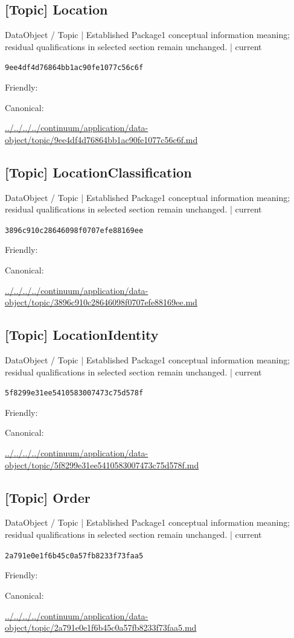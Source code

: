 \documentclass[10pt,a4paper]{article}
\begin{document}
\subsection*{[Topic] Location}
{\small DataObject / Topic | Established Package1 conceptual information meaning; residual qualifications in selected section remain unchanged. | current}\par
\texttt{9ee4df4d76864bb1ac90fe1077c56c6f}\par
Friendly: \par
Canonical: \par
{\footnotesize\url{../../../../continuum/application/data-object/topic/9ee4df4d76864bb1ac90fe1077c56c6f.md}}\par
\subsection*{[Topic] LocationClassification}
{\small DataObject / Topic | Established Package1 conceptual information meaning; residual qualifications in selected section remain unchanged. | current}\par
\texttt{3896c910c28646098f0707efe88169ee}\par
Friendly: \par
Canonical: \par
{\footnotesize\url{../../../../continuum/application/data-object/topic/3896c910c28646098f0707efe88169ee.md}}\par
\subsection*{[Topic] LocationIdentity}
{\small DataObject / Topic | Established Package1 conceptual information meaning; residual qualifications in selected section remain unchanged. | current}\par
\texttt{5f8299e31ee5410583007473c75d578f}\par
Friendly: \par
Canonical: \par
{\footnotesize\url{../../../../continuum/application/data-object/topic/5f8299e31ee5410583007473c75d578f.md}}\par
\subsection*{[Topic] Order}
{\small DataObject / Topic | Established Package1 conceptual information meaning; residual qualifications in selected section remain unchanged. | current}\par
\texttt{2a791e0e1f6b45c0a57fb8233f73faa5}\par
Friendly: \par
Canonical: \par
{\footnotesize\url{../../../../continuum/application/data-object/topic/2a791e0e1f6b45c0a57fb8233f73faa5.md}}\par
\end{document}
